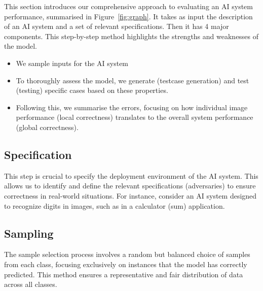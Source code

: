 \documentclass[10pt, conference, a4paper, final]{IEEEtran}
\begin{document}
This section introduces our comprehensive approach to evaluating an AI system performance, summarised in Figure~\ref{fig:graph}. It takes as input the description of an AI system and a set of relevant specifications. Then it has 4 major components. This step-by-step method highlights the strengths and weaknesses of the model.
\begin{itemize}

\item We sample inputs for the AI system
\item To thoroughly assess the model, we generate (testcase generation) and test (testing) specific cases based on these properties.
  
\item Following this, we summarise the errors, focusing on how individual image performance (local correctness) translates to the overall system performance (global correctness). 
\end{itemize}


\subsection{Specification}

This step is crucial to specify the deployment environment of the AI system. This allows us to identify and define the relevant specifications (adversaries) to ensure correctness in real-world situations. For instance, consider an AI system designed to recognize digits in images, such as in a calculator (sum)  application. 


\subsection{Sampling}
 The sample selection process involves a random but balanced choice of samples from each class, focusing exclusively on instances that the model has correctly predicted. This method ensures a representative and fair distribution of data across all classes.
\end{document}

